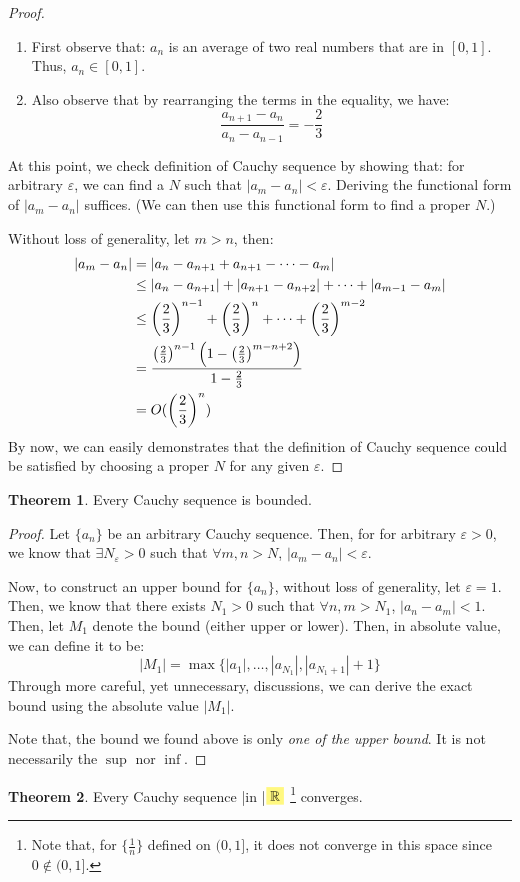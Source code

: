\documentclass[12pt]{article}
\renewcommand{\epsilon}{\varepsilon}
\newcommand{\R}{{\mathbb R}}
\theoremstyle{definition}
\newtheorem{theorem}{Theorem}[section]
\theoremstyle{plain}
\newcommand{\highlight}[1]{%
 \colorbox{yellow!50}{$\displaystyle#1$}}
\begin{document}
\begin{proof}
    \begin{enumerate}[Step 1]
        \item First observe that: $a_n$ is an average of two real numbers that are in $[0,1]$. Thus, 
            $a_n \in [0,1]$.

        \item Also observe that by rearranging the terms in the equality, we 
            have: 
            \[
                \frac{a_{n+1} - a_n}{a_n - a_{n-1}} = - \frac{2}{3}
            \]
    \end{enumerate}
    At this point, we check definition of Cauchy sequence by showing that: for 
    arbitrary $\epsilon$, we can find a $N$ such that $|a_m - a_n| < 
    \varepsilon$. Deriving the functional form of $|a_m  -a_n|$ suffices. (We 
    can then use this functional form to find a proper $N$.)

    Without loss of generality, let $m > n$, then:
    \[
        \aligned
        |a_m - a_n|& = |a_n - a_{n+1} + a_{n+1} - \cdots - a_m|\\
        & \le |a_n - a_{n+1}| + |a_{n+1} - a_{n+2} | + \cdots + |a_{m-1} - a_m| 
        \\
        & \le \left( \frac{2}{3} \right)^{n-1} + \left( \frac{2}{3} \right)^n + 
        \cdots + \left( \frac{2}{3} \right)^{m-2} \\
        & = \frac{\left( \frac{2}{3} \right)^{n-1}\left( 1 - \left( 
                    \frac{2}{3} 
        \right)^{m-n+2} \right)}{1 -  \frac{2}{3}} \\
        & = O(\left( \frac{2}{3} \right)^n)
        \endaligned
    \]
    By now, we can easily demonstrates that the definition of Cauchy sequence 
    could be satisfied by choosing a proper $N$ for any given 
    $\varepsilon$.
\end{proof}

\begin{theorem}
    Every Cauchy sequence is bounded.
    \begin{proof} Let $\{a_n\}$ be an arbitrary Cauchy sequence. Then, for for 
        arbitrary $\varepsilon>0$, we know that $\exists N_\varepsilon > 0$ such 
        that $\forall m,n > N$, $|a_m - a_n | < \varepsilon$.

        Now, to construct an upper bound for $\{a_n\}$, without loss of 
        generality, let $\varepsilon = 1$. Then, we know that there exists $N_1 
        > 0$ such that $\forall n,m > N_1$, $|a_n - a_m| < 1$. Then, let $M_1$ 
        denote the bound (either upper or lower). Then, in absolute value, we can 
        define it to be: 
        \[
            |M_1| = \max \{|a_1|, \ldots, |a_{N_{1}}|, |a_{N_1+1}| +  
            1\}
        \]
        Through more careful, yet unnecessary, discussions, we can derive the 
        exact bound using the absolute value $|M_1|$.

        Note that, the bound we found above is only \textit{one of the upper 
        bound}. It is not necessarily the $\sup$ nor $\inf$.
    \end{proof}
\end{theorem}

\begin{theorem}
    Every Cauchy sequence \yverb|in |$\highlight{\R}$ \footnote{Note that, for 
        $\{\frac{1}{n}\}$ defined on $(0,1]$, it does not converge in this space 
        since $0\not\in (0,1]$.}
        converges.
\end{theorem}
\end{document}
